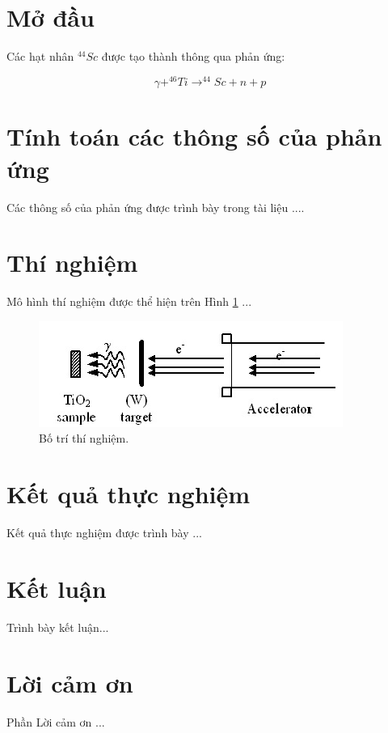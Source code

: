 \documentclass[11pt, a4paper, journal]{paper}
\begin{document}
\begin{multicols}{2}

\section{Mở đầu}
Các hạt nhân $^{44}Sc$ được tạo thành thông qua phản ứng:

\begin{equation}
\gamma + ^{46}Ti \rightarrow ^{44}Sc + n + p
\end{equation}



\section{Tính toán các thông số của phản ứng}
Các thông số của phản ứng được trình bày trong tài liệu \cite{bib_boston1997, bib_Klein, bib_Knoll} ....



\section{Thí nghiệm}
Mô hình thí nghiệm được thể hiện trên Hình \ref{fig:exp} ...

\begin{figure}[H]
\centering
	\includegraphics[width=0.7\linewidth]{exp.png}
	\caption{Bố trí thí nghiệm.}
	\label{fig:exp}
\end{figure}



\section{Kết quả thực nghiệm}
Kết quả thực nghiệm được trình bày ...

 

\section{Kết luận}
Trình bày kết luận...



\section{Lời cảm ơn}
Phần Lời cảm ơn ...






\end{multicols}
\end{document}
